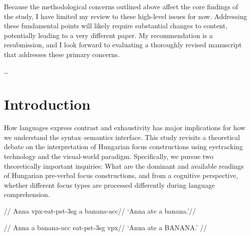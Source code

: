 \documentclass[a4paper, ruler]{CUP-JNL-LIN}%
\begin{document}
Because the methodological concerns outlined above affect the core findings of the study, I have limited my review to these high-level issues for now. Addressing these fundamental points will likely require substantial changes to content, potentially leading to a very different paper. My recommendation is a resubmission, and I look forward to evaluating a thoroughly revised manuscript that addresses these primary concerns.

\dots

\section{Introduction}

How languages express contrast and exhaustivity has major implications for how we understand the syntax--semantics interface. This study revisits a theoretical debate on the interpretation of Hungarian focus constructions using eyetracking technology and the visual-world paradigm. Specifically, we pursue two theoretically important inquiries: What are the dominant and available readings of Hungarian pre-verbal focus constructions, and from a cognitive perspective, whether different focus types are processed differently during language comprehension. 

\pex[everygla={},aboveglftskip=0em,interpartskip=0pt]
\begingl \label{ex:neutral}
//
\glb Anna{\sc [nom]} {\sc vpx}-eat-{\sc pst-3sg} a banana-{\sc acc}//
\glft `Anna ate a banana.'//
\endgl
\xe

\vspace{-12px}

\pex[everygla={},aboveglftskip=0em,interpartskip=0pt]
\begingl \label{ex:pvf}
//
\glb Anna{\sc [nom]} a banana-{\sc acc} eat-{\sc pst-3sg} {\sc vpx}//
\glft `Anna ate a BANANA.' //
\endgl
\xe


\end{document}
